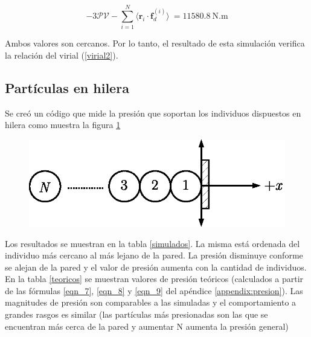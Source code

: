 \begin{equation}
 -3\mathcal{PV} -\displaystyle\sum_{i=1}^N \langle
\mathbf{r}_i\cdot\mathbf{f}_d^{(i)}\rangle\ =  11580.8\ \text{N.m}
\end{equation}

Ambos valores son cercanos. Por lo tanto, el resultado de esta simulación verifica la relación del virial (\ref{virial2}).


\subsection{Partículas en hilera}

Se creó un código que mide la presión que soportan los individuos dispuestos en hilera como muestra la figura \ref{hilera} 

\begin{figure}[!htbp]
\center
\includegraphics[scale=1]{figuras/hilera.eps}
\caption{\label{hilera}}
\end{figure}

Los resultados se muestran en la tabla \ref{simulados}. La misma está ordenada del individuo más cercano al más lejano de la pared. La presión disminuye conforme se alejan de la pared y el valor de presión aumenta con la cantidad de individuos.\\
En la tabla \ref{teoricos} se muestran valores de presión teóricos (calculados a partir de las fórmulas \ref{eqn_7}, \ref{eqn_8} y \ref{eqn_9} del apéndice \ref{appendix:presion}). Las magnitudes de presión son comparables a las simuladas y el comportamiento a grandes rasgos es similar (las partículas más presionadas son las que se encuentran más cerca de la pared y aumentar N aumenta la presión general)  

